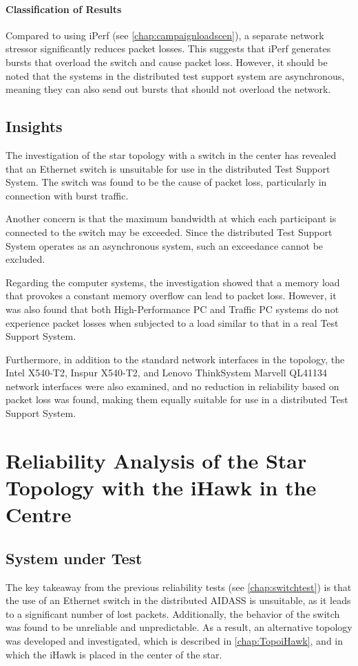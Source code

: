 \paragraph{Classification of Results}
Compared to using iPerf (see \ref{chap:campaignloadscen}), a separate network stressor significantly reduces packet losses. This suggests that iPerf generates bursts that overload the switch and cause packet loss. However, it should be noted that the systems in the distributed test support system are asynchronous, meaning they can also send out bursts that should not overload the network.

\subsection{Insights}
The investigation of the star topology with a switch in the center has revealed that an Ethernet switch is unsuitable for use in the distributed Test Support System. The switch was found to be the cause of packet loss, particularly in connection with burst traffic.

Another concern is that the maximum bandwidth at which each participant is connected to the switch may be exceeded. Since the distributed Test Support System operates as an asynchronous system, such an exceedance cannot be excluded.

Regarding the computer systems, the investigation showed that a memory load that provokes a constant memory overflow can lead to packet loss. However, it was also found that both High-Performance PC and Traffic PC systems do not experience packet losses when subjected to a load similar to that in a real Test Support System.

Furthermore, in addition to the standard network interfaces in the topology, the Intel X540-T2, Inspur X540-T2, and Lenovo ThinkSystem Marvell QL41134 network interfaces were also examined, and no reduction in reliability based on packet loss was found, making them equally suitable for use in a distributed Test Support System.




\section{Reliability Analysis of the Star Topology with the iHawk in the Centre}

\subsection{System under Test}
The key takeaway from the previous reliability tests (see \ref{chap:switchtest}) is that the use of an Ethernet switch in the distributed AIDASS is unsuitable, as it leads to a significant number of lost packets. Additionally, the behavior of the switch was found to be unreliable and unpredictable. As a result, an alternative topology was developed and investigated, which is described in \ref{chap:TopoiHawk}, and in which the iHawk is placed in the center of the star.

